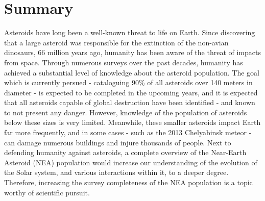\chapter{Summary}

Asteroids have long been a well-known threat to life on Earth. Since discovering that a large asteroid was responsible for the extinction of the non-avian dinosaurs, 66 million years ago, humanity has been aware of the threat of impacts from space. Through numerous surveys over the past decades, humanity has achieved a substantial level of knowledge about the asteroid population. The goal which is currently persued - cataloguing 90\% of all asteroids over 140 meters in diameter - is expected to be completed in the upcoming years, and it is expected that all asteroids capable of global destruction have been identified - and known to not present any danger. However, knowledge of the population of asteroids below these sizes is very limited. Meanwhile, these smaller asteroids impact Earth far more frequently, and in some cases - such as the 2013 Chelyabinsk meteor - can damage numerous buildings and injure thousands of people. Next to defending humanity against asteroids, a complete overview of the Near-Earth Asteroid (NEA) population would increase our understanding of the evolution of the Solar system, and various interactions within it, to a deeper degree. Therefore, increasing the survey completeness of the NEA population is a topic worthy of scientific pursuit. \\

